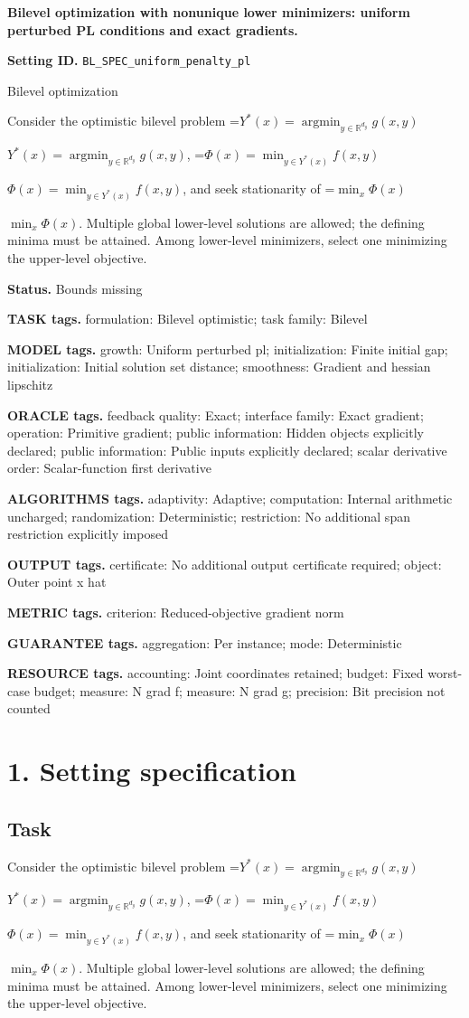 \documentclass[10pt,a4paper]{article}
\newcommand{\AtlasMath}[1]{\par\begingroup\centering\setbox0=\hbox{$\displaystyle #1$}\ifdim\wd0>1.4\linewidth\typeout{ATLAS WIDE FORMULA: \the\wd0}\fi\ifdim\wd0>\linewidth\resizebox{\linewidth}{!}{\box0}\else\box0\fi\par\endgroup}
\newcommand{\AtlasInlineMath}[1]{\begingroup\setbox0=\hbox{$#1$}\ifdim\wd0>.4\linewidth\endgroup\AtlasMath{#1}\else\endgroup$#1$\fi}
\begin{document}
\raggedright

{\LARGE\bfseries\sffamily\color{AtlasNavy} Bilevel optimization with nonunique lower minimizers: uniform perturbed PL conditions and exact gradients.\par}\vspace{5pt}
\textbf{Setting ID.} \texttt{BL\_\allowbreak{}SPEC\_\allowbreak{}uniform\_\allowbreak{}penalty\_\allowbreak{}pl}

Bilevel optimization

Consider the optimistic bilevel problem \AtlasInlineMath{Y^*(x)=\operatorname*{argmin}_{y\in\mathbb{R}^{d_y}}g(x,y)}, \AtlasInlineMath{\Phi(x)=\min_{y\in Y^*(x)}f(x,y)}, and seek stationarity of \AtlasInlineMath{\min_x\Phi(x)}. Multiple global lower-level solutions are allowed; the defining minima must be attained. Among lower-level minimizers, select one minimizing the upper-level objective.

\textbf{Status.} Bounds missing

\textbf{TASK tags.} formulation: Bilevel optimistic; task family: Bilevel

\textbf{MODEL tags.} growth: Uniform perturbed pl; initialization: Finite initial gap; initialization: Initial solution set distance; smoothness: Gradient and hessian lipschitz

\textbf{ORACLE tags.} feedback quality: Exact; interface family: Exact gradient; operation: Primitive gradient; public information: Hidden objects explicitly declared; public information: Public inputs explicitly declared; scalar derivative order: Scalar-function first derivative

\textbf{ALGORITHMS tags.} adaptivity: Adaptive; computation: Internal arithmetic uncharged; randomization: Deterministic; restriction: No additional span restriction explicitly imposed

\textbf{OUTPUT tags.} certificate: No additional output certificate required; object: Outer point x hat

\textbf{METRIC tags.} criterion: Reduced-objective gradient norm

\textbf{GUARANTEE tags.} aggregation: Per instance; mode: Deterministic

\textbf{RESOURCE tags.} accounting: Joint coordinates retained; budget: Fixed worst-case budget; measure: N grad f; measure: N grad g; precision: Bit precision not counted

\section{1. Setting specification}
\subsection{Task}
Consider the optimistic bilevel problem \AtlasInlineMath{Y^*(x)=\operatorname*{argmin}_{y\in\mathbb{R}^{d_y}}g(x,y)}, \AtlasInlineMath{\Phi(x)=\min_{y\in Y^*(x)}f(x,y)}, and seek stationarity of \AtlasInlineMath{\min_x\Phi(x)}. Multiple global lower-level solutions are allowed; the defining minima must be attained. Among lower-level minimizers, select one minimizing the upper-level objective.
\end{document}
